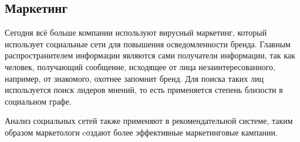  
\subsection{Маркетинг}
Сегодня всё больше компании используют вирусный маркетинг, который использует социальные сети для повышения осведомленности бренда. Главным распространителем информации являются сами получатели информации, так как человек, получающий сообщение, исходящее от лица незаинтересованного, например, от знакомого, охотнее запомнит бренд. Для поиска таких лиц используется поиск лидеров мнений, то есть применяется степень близости\cite{closeness_marketing} в социальном графе.
  
Анализ социальных сетей также применяют в рекомендательной системе, таким образом маркетологи cоздают более эффективные маркетинговые кампании.









